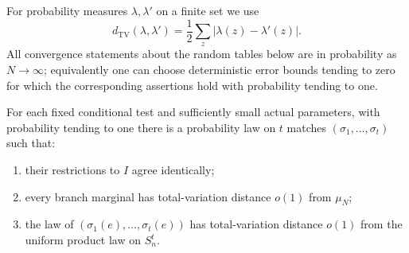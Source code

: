 For probability measures $\lambda,\lambda'$ on a finite set we use
\[
d_{\mathrm{TV}}(\lambda,\lambda')
 =\frac12\sum_z|\lambda(z)-\lambda'(z)|.
\]
All convergence statements about the random tables below are in
probability as $N\to\infty$; equivalently one can choose deterministic
error bounds tending to zero for which the corresponding assertions
hold with probability tending to one.

\begin{lemma}\label{sample:lem-coupling}
For each fixed conditional test and sufficiently small actual
parameters, with probability tending to one there is a probability
law on $t$ matches $(\sigma_1,\ldots,\sigma_t)$ such that:
\begin{enumerate}
\item their restrictions to $I$ agree identically;
\item every branch marginal has total-variation distance $o(1)$ from
$\mu_N$;
\item the law of $(\sigma_1(e),\ldots,\sigma_t(e))$ has
total-variation distance $o(1)$ from the uniform product law on $S_n^t$.
\end{enumerate}
\end{lemma}
